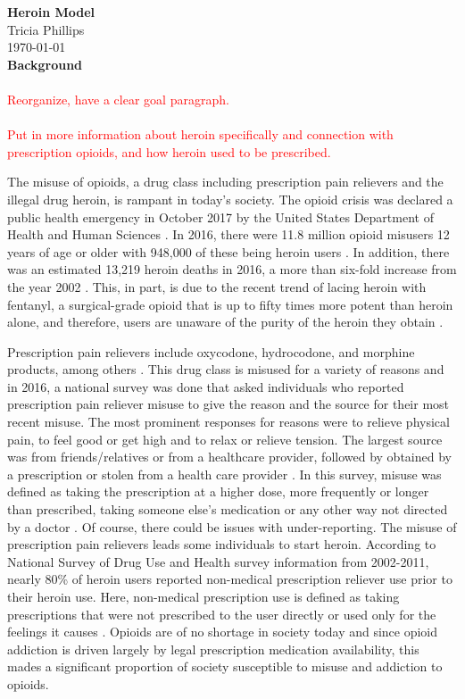 \documentclass[12pt]{article}
\begin{document}
\textbf{Heroin Model} \\
Tricia Phillips \\
\today \\

\textbf{Background} \\ \\

\textcolor{red} {Reorganize, have a clear goal paragraph.} \\ \\
\textcolor{red}{Put in more information about heroin specifically and connection with prescription opioids, and how heroin used to be prescribed.}


The misuse of opioids, a drug class including prescription pain relievers and the illegal drug heroin, is rampant in today's society. The opioid crisis was declared a public health emergency in October 2017 by the United States Department of Health and Human Sciences \cite{HHS1}. In 2016, there were 11.8 million opioid misusers 12 years of age or older with 948,000 of these being heroin users \cite{CDC2}. In addition, there was an estimated 13,219 heroin deaths in 2016, a more than six-fold increase from the year 2002 \cite{NSDUH1}. This, in part, is due to the recent trend of lacing heroin with fentanyl, a surgical-grade opioid that is up to fifty times more potent than heroin alone, and therefore, users are unaware of the purity of the heroin they obtain \cite{CDC1} \cite{Volkow}. 

Prescription pain relievers include oxycodone, hydrocodone, and morphine products, among others \cite{CDC3}. This drug class is misused for a variety of reasons and in 2016, a national survey was done that asked individuals who reported prescription pain reliever misuse to give the reason and the source for their most recent misuse. The most prominent responses for reasons were to relieve physical pain, to feel good or get high and to relax or relieve tension. The largest source was from friends/relatives or from a healthcare provider, followed by obtained by a prescription or stolen from a health care provider \cite{CDC2}. In this survey, misuse was defined as taking the prescription at a higher dose, more frequently or longer than prescribed, taking someone else's medication or any other way not directed by a doctor \cite{SAMSHA3}. Of course, there could be issues with under-reporting. The misuse of prescription pain relievers leads some individuals to start heroin.  According to National Survey of Drug Use and Health survey information from 2002-2011, nearly 80\% of heroin users reported non-medical prescription reliever use prior to their heroin use. Here, non-medical prescription use is defined as taking prescriptions that were not prescribed to the user directly or used only for the feelings it causes \cite{Muhuri}. Opioids are of no shortage in society today and since opioid addiction is driven largely by legal prescription medication availability, this mades a significant proportion of society susceptible to misuse and addiction to opioids. 
\end{document}
